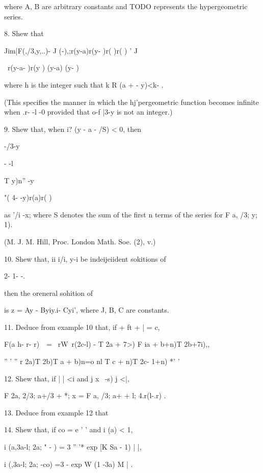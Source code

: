where A, B are arbitrary constants and TODO represents the
hypergeometric series.


8. Shew that

Jim|F(,/3,y,..)- J (-),;r(y-a)r(y- )r( )r( ) ' J

\ r(y-a- )r(y ) (y-a) (y- )

where h is the integer such that k R (a + - y)<k- .

(This specifies the manner in which the hj'pergeometric function
becomes infinite when .r- -l -0 provided that o-f |3-y is not an
integer.) 

9. Shew that, when i? (y - a - /S) < 0, then

-/3-y

- -l

T y)n'' -y

 "( 4- -y)r(a)r( )

as '/i -x; where S denotes the sum of the first n terms of the series
for F a, /3; y; 1).

(M. J. M. Hill, Proc. London Math. Soe. (2), v.)

%
%

10. Shew that, ii i/i, y-i be indeijeiident sokitions of

 2- 1- -.

then the oreneral sohition of

is z = Ay - Byiy.i- Cyi', where J, B, C are constants.


11. Deduce from example 10 that, if + ft + | = c,

 F(a h- r- r)\ \ = \ rW\ r(2c-l) - T 2a + 7>) F ia + b+n)T 2b+7i),,

'' ' '' r 2a)T 2b)T a + b)n=o nl T c + n)T 2c- 1+n) *' '


12. Shew that, if | | <i and j x \ -s) j <|,

F 2a, 2/3; a+/3 + *; x = F a, /3; a+ + l; 4.r(l-.r) . 

13. Deduce from example 12 that

14. Shew that, if co = e ' ' and i (a) < 1,

i (a,3a-l; 2a; " - ) = 3 '' '* exp [K Sa - 1) | |,

i (,3a-l; 2a; -co) =3 - exp W (1 -3a) M | .

